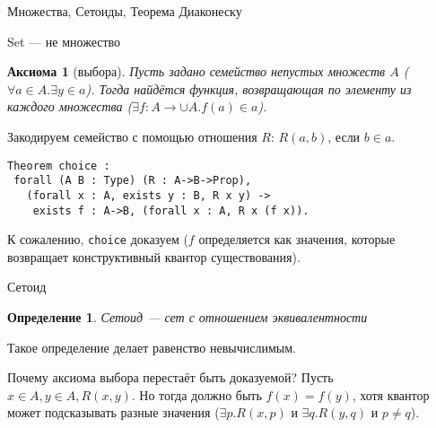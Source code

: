 \documentclass[aspectratio=169,dvipsnames,usenames]{beamer}
\begin{document}
\newtheorem{dfn}{Определение}[section]
\newtheorem{nte}{Замечание}[section]

\newtheorem{axiom}{Аксиома}[section]
\newtheorem{thm}{Теорема}[section]
\newtheorem{lmm}[theorem]{Лемма}
\newtheorem{statement}{Утверждение}[section]
\newtheorem{oun_paragraph}{Пункт}[section]
\newtheorem{cons}{Следствие}[section]
\newtheorem*{exm}{Пример}

\newcommand{\comb}[1]{\operatorname{\mathcal{#1}}}
\newcommand{\func}[1]{\operatorname{#1}}
\newcommand{\reduction}[1]{{\color{OrangeRed}#1}}
\newcommand{\set}[1]{\left\{#1\right\}}

\def\from#1{\par \parbox{0.7\textwidth}{\par \hfill\raggedleft \it #1}} 

\begin{frame}{}
\begin{center}
{\LARGE Множества, Сетоиды, Теорема Диаконеску}
\end{center}
\end{frame}

\begin{frame}[fragile]{Set --- не множество}
\begin{axiom}[выбора]Пусть задано семейство непустых множеств $A$
($\forall a \in A.\exists y \in a$).
Тогда найдётся функция, возвращающая по элементу из каждого множества
($\exists f: A \rightarrow \cup A. f(a) \in a$).
\end{axiom}

Закодируем семейство с помощью отношения $R$: $R(a,b)$, если $b \in a$.

\begin{verbatim}
Theorem choice :
 forall (A B : Type) (R : A->B->Prop),
   (forall x : A, exists y : B, R x y) ->
    exists f : A->B, (forall x : A, R x (f x)).
\end{verbatim}

К сожалению, \verb!choice! доказуем ($f$ определяется как значения, которые возвращает конструктивный квантор существования).
\end{frame}

\begin{frame}[fragile]{Сетоид}
\begin{dfn}Сетоид --- сет с отношением эквивалентности\end{dfn}

Такое определение делает равенство невычислимым.

Почему аксиома выбора перестаёт быть доказуемой?
Пусть $x \in A, y \in A, R(x,y)$. Но тогда должно быть $f(x) = f(y)$, хотя
квантор может подсказывать разные значения
($\exists p.R(x,p)$ и $\exists q.R(y,q)$ и $p \ne q$).
\end{frame}
\end{document}
